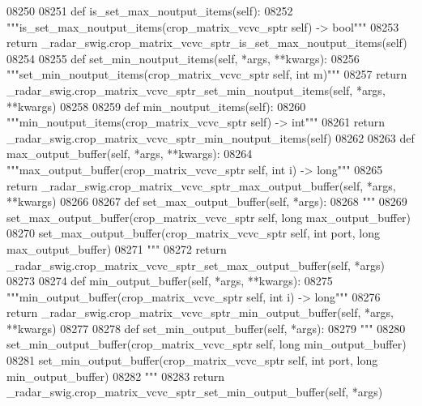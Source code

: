 \begin{DoxyCode}
{{{{{{{{{{{{{{{{{{{{{{{{{{{08250 
08251     \textcolor{keyword}{def }is_set_max_noutput_items(self):
08252         \textcolor{stringliteral}{"""is\_set\_max\_noutput\_items(crop\_matrix\_vcvc\_sptr self) -> bool"""}
08253         \textcolor{keywordflow}{return} \_radar\_swig.crop\_matrix\_vcvc\_sptr\_is\_set\_max\_noutput\_items(self)
08254 
08255     \textcolor{keyword}{def }set_min_noutput_items(self, *args, **kwargs):
08256         \textcolor{stringliteral}{"""set\_min\_noutput\_items(crop\_matrix\_vcvc\_sptr self, int m)"""}
08257         \textcolor{keywordflow}{return} \_radar\_swig.crop\_matrix\_vcvc\_sptr\_set\_min\_noutput\_items(self, *args, **kwargs)
08258 
08259     \textcolor{keyword}{def }min_noutput_items(self):
08260         \textcolor{stringliteral}{"""min\_noutput\_items(crop\_matrix\_vcvc\_sptr self) -> int"""}
08261         \textcolor{keywordflow}{return} \_radar\_swig.crop\_matrix\_vcvc\_sptr\_min\_noutput\_items(self)
08262 
08263     \textcolor{keyword}{def }max_output_buffer(self, *args, **kwargs):
08264         \textcolor{stringliteral}{"""max\_output\_buffer(crop\_matrix\_vcvc\_sptr self, int i) -> long"""}
08265         \textcolor{keywordflow}{return} \_radar\_swig.crop\_matrix\_vcvc\_sptr\_max\_output\_buffer(self, *args, **kwargs)
08266 
08267     \textcolor{keyword}{def }set_max_output_buffer(self, *args):
08268         \textcolor{stringliteral}{"""}
08269 \textcolor{stringliteral}{        set\_max\_output\_buffer(crop\_matrix\_vcvc\_sptr self, long max\_output\_buffer)}
08270 \textcolor{stringliteral}{        set\_max\_output\_buffer(crop\_matrix\_vcvc\_sptr self, int port, long max\_output\_buffer)}
08271 \textcolor{stringliteral}{        """}
08272         \textcolor{keywordflow}{return} \_radar\_swig.crop\_matrix\_vcvc\_sptr\_set\_max\_output\_buffer(self, *args)
08273 
08274     \textcolor{keyword}{def }min_output_buffer(self, *args, **kwargs):
08275         \textcolor{stringliteral}{"""min\_output\_buffer(crop\_matrix\_vcvc\_sptr self, int i) -> long"""}
08276         \textcolor{keywordflow}{return} \_radar\_swig.crop\_matrix\_vcvc\_sptr\_min\_output\_buffer(self, *args, **kwargs)
08277 
08278     \textcolor{keyword}{def }set_min_output_buffer(self, *args):
08279         \textcolor{stringliteral}{"""}
08280 \textcolor{stringliteral}{        set\_min\_output\_buffer(crop\_matrix\_vcvc\_sptr self, long min\_output\_buffer)}
08281 \textcolor{stringliteral}{        set\_min\_output\_buffer(crop\_matrix\_vcvc\_sptr self, int port, long min\_output\_buffer)}
08282 \textcolor{stringliteral}{        """}
08283         \textcolor{keywordflow}{return} \_radar\_swig.crop\_matrix\_vcvc\_sptr\_set\_min\_output\_buffer(self, *args)
}}}}}}}}}}}}}}}}}}}}}}}}}}}
\end{DoxyCode}
